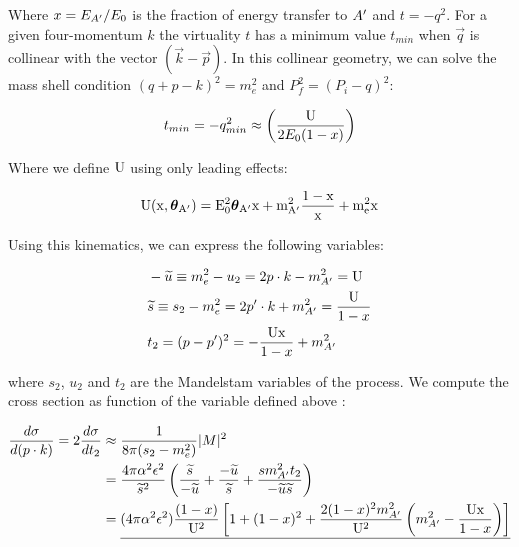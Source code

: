  Where $x=E_{A'}/E_0$ is the fraction of energy transfer to $A'$ and $t=-q^2$. For a given four-momentum $k$ the virtuality $t$ has a minimum value $t_{min}$ when $\vec{q}$ is collinear with the vector $(\vec{k} - \vec{p})$. In this collinear geometry, we can solve the mass shell condition $(q + p - k)^2 = m^2_e$ and $P^2_f = (P_i - q)^2$:

 \begin{equation}
   \label{eq:t-min}
   t_{min} = -q^2_{min} \approx \left(\frac{\rm{U}}{2E_0 (1 - x)} \right)
 \end{equation}

 Where we define $\rm{U}$ using only leading effects:

 \begin{equation}
   \label{eq:dp-u}
   \rm{U}(x, \boldsymbol{\theta}_{A'} ) = E_0^2 \boldsymbol{\theta}_{A'} x + m^2_{A'} \frac{1-x}{x} + m^2_e x
 \end{equation}

 Using this kinematics, we can express the following variables:

 \begin{equation}
   \label{eq:dp-md-var}
   \begin{aligned}
     &-\widetilde{u} \equiv m_e^2 - u_2 = 2p\cdot k - m^2_{A'} = \rm{U}\\
     &\widetilde{s}  \equiv s_2 - m_e^2 = 2p' \cdot k + m^2_{A'} = \frac{\rm{U}}{1-x} \\
     &t_2 = (p - p')^2 = - \frac{\rm{U}x}{1-x} + m^2_{A'}
   \end{aligned}
 \end{equation}

 where $s_2$, $u_2$ and $t_2$ are the Mandelstam variables of the process. We compute the cross section as function of the variable defined above \cite{jdb}:

 \begin{equation}
   \label{eq:dp-cs-comp}
   \begin{aligned}
     \frac{d \sigma}{d(p \cdot k)} = 2 \frac{d\sigma}{dt_2} &\approx \frac{1}{8 \pi (s_2 - m^2_e)} |M|^2 \\
     &=\frac{4 \pi \alpha^2 \epsilon^2}{\widetilde{s}^2} \left( \frac{\widetilde{s}}{-\widetilde{u}} + \frac{-\widetilde{u}}{\widetilde{s}} + \frac{s m^2_{A'} t_2}{-\widetilde{u}\widetilde{s}} \right) \\
           &=\underline{(4 \pi \alpha^2 \epsilon^2) \frac{(1-x)}{\rm{U}^2} \left[ 1 + (1 - x)^2 + \frac{2(1-x)^2m^2_{A'}}{\rm{U}^2} \left( m^2_{A'} - \frac{\rm{U}x}{1-x} \right) \right]}
   \end{aligned}
 \end{equation}

